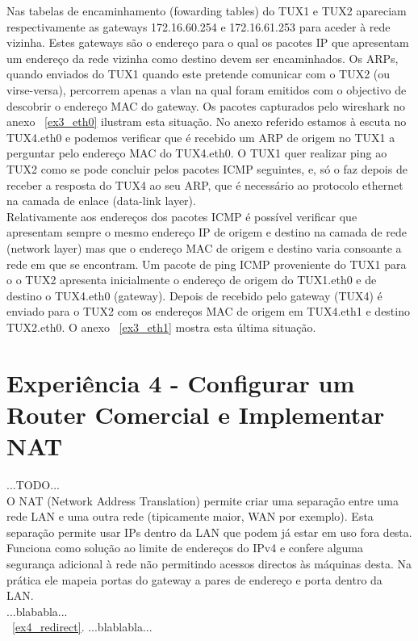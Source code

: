 \documentclass[11pt,a4paper,reqno]{report}
\numberwithin{equation}{section}
\begin{document}
Nas tabelas de encaminhamento (fowarding tables) do TUX1 e TUX2 apareciam respectivamente as gateways 172.16.60.254 e 172.16.61.253 para aceder à rede vizinha. Estes gateways são o endereço para o qual os pacotes IP que apresentam um endereço da rede vizinha como destino devem ser encaminhados. Os ARPs, quando enviados do TUX1 quando este pretende comunicar com o TUX2 (ou virse-versa), percorrem apenas a vlan na qual foram emitidos com o objectivo de descobrir o endereço MAC do gateway. Os pacotes capturados pelo wireshark no anexo ~\ref{ex3_eth0} ilustram esta situação.
No anexo referido estamos à escuta no TUX4.eth0 e podemos verificar que é recebido um ARP de origem no TUX1 a perguntar pelo endereço MAC do TUX4.eth0. O TUX1 quer realizar ping ao TUX2 como se pode concluir pelos pacotes ICMP seguintes, e, só o faz depois de receber a resposta do TUX4 ao seu ARP, que é necessário ao protocolo ethernet na camada de enlace (data-link layer). \\

Relativamente aos endereços dos pacotes ICMP é possível verificar que apresentam sempre o mesmo endereço IP de origem e destino na camada de rede (network layer) mas que o endereço MAC de origem e destino varia consoante a rede em que se encontram. Um pacote de ping ICMP proveniente do TUX1 para o o TUX2 apresenta inicialmente o endereço de origem do TUX1.eth0 e de destino o TUX4.eth0 (gateway). Depois de recebido pelo gateway (TUX4) é enviado para o TUX2 com os endereços MAC de origem em TUX4.eth1 e destino TUX2.eth0. O anexo  ~\ref{ex3_eth1} mostra esta última situação.



\section{Experiência 4 - Configurar um Router Comercial e Implementar NAT}
...TODO...\\
O NAT (Network Address Translation) permite criar uma separação entre uma rede LAN e uma outra rede (tipicamente maior, WAN por exemplo). Esta separação permite usar IPs dentro da LAN que podem já estar em uso fora desta. Funciona como solução ao limite de endereços do IPv4 e confere alguma segurança adicional à rede não permitindo acessos directos às máquinas desta. Na prática ele mapeia portas do gateway a pares de endereço e porta dentro da LAN.\\
...blababla...\\
~\ref{ex4_redirect}.
...blablabla...\\
\end{document}

